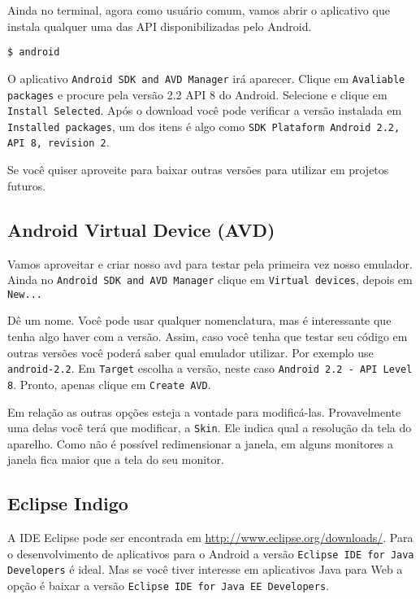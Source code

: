 Ainda no terminal, agora como usuário comum, vamos abrir o aplicativo que instala qualquer uma
das API disponibilizadas pelo Android.

\medskip

\begin{flushleft}
\texttt{\$ android}
\end{flushleft}

\medskip

O aplicativo \texttt{Android SDK and AVD Manager} irá aparecer. Clique em \texttt{Avaliable packages}
e procure pela versão 2.2 API 8 do Android. Selecione e clique em \texttt{Install Selected}. Após
o download você pode verificar a versão instalada em \texttt{Installed packages}, um dos itens é
algo como \texttt{SDK Plataform Android 2.2, API 8, revision 2}.

Se você quiser aproveite para baixar outras versões para utilizar em projetos futuros.

\subsection{Android Virtual Device (AVD)}

Vamos aproveitar e criar nosso \gls{avd} para testar pela primeira vez nosso emulador. Ainda no
\texttt{Android SDK and AVD Manager} clique em \texttt{Virtual devices}, depois em \texttt{New...}

Dê um nome. Você pode usar qualquer nomenclatura, mas é interessante que tenha algo haver com a versão. Assim,
caso você tenha que testar seu código em outras versões você poderá saber qual emulador utilizar. Por
exemplo use \texttt{android-2.2}. Em \texttt{Target} escolha a versão, neste caso
\texttt{Android 2.2 - API Level 8}. Pronto, apenas clique em \texttt{Create AVD}.

Em relação as outras opções esteja a vontade para modificá-las. Provavelmente uma delas você terá que
modificar, a \texttt{Skin}. Ele indica qual a resolução da tela do aparelho. Como não é possível
redimensionar a janela, em alguns monitores a janela fica maior que a tela do seu monitor.

\subsection{Eclipse Indigo}

A IDE Eclipse pode ser encontrada em \url{http://www.eclipse.org/downloads/}. Para o desenvolvimento
de aplicativos para o Android a versão \texttt{Eclipse IDE for Java Developers} é ideal. Mas se você
tiver interesse em aplicativos Java para Web a opção é baixar a versão \texttt{Eclipse IDE for Java EE Developers}.

